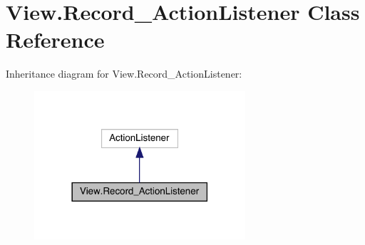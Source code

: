 \hypertarget{class_view_1_1_record___action_listener}{}\section{View.\+Record\+\_\+\+Action\+Listener Class Reference}
\label{class_view_1_1_record___action_listener}


Inheritance diagram for View.\+Record\+\_\+\+Action\+Listener\+:
\nopagebreak
\begin{figure}[H]
\begin{center}
\leavevmode
\includegraphics[width=222pt]{class_view_1_1_record___action_listener__inherit__graph}
\end{center}
\end{figure}


